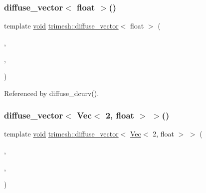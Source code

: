 \subsubsection{\texorpdfstring{diffuse\+\_\+vector$<$ float $>$()}{diffuse\_vector< float >()}}
{\footnotesize\ttfamily template \hyperlink{namespacetrimesh_a784ddfd979e1c579bda795a8edfc3f43}{void} \hyperlink{namespacetrimesh_a8fa6ac94a71d33cb6e11c29e76501519}{trimesh\+::diffuse\+\_\+vector}$<$ float $>$ (\begin{DoxyParamCaption}\item[{\hyperlink{classtrimesh_1_1TriMesh}{Tri\+Mesh} $\ast$}]{,  }\item[{vector$<$ float $>$ \&}]{,  }\item[{float}]{ }\end{DoxyParamCaption})}



Referenced by diffuse\+\_\+dcurv().

\mbox{\label{namespacetrimesh_a2dbe3f073888c87f6853c5c0ea262688}} 
\subsubsection{\texorpdfstring{diffuse\+\_\+vector$<$ Vec$<$ 2, float $>$ $>$()}{diffuse\_vector< Vec< 2, float > >()}}
{\footnotesize\ttfamily template \hyperlink{namespacetrimesh_a784ddfd979e1c579bda795a8edfc3f43}{void} \hyperlink{namespacetrimesh_a8fa6ac94a71d33cb6e11c29e76501519}{trimesh\+::diffuse\+\_\+vector}$<$ \hyperlink{classtrimesh_1_1Vec}{Vec}$<$ 2, float $>$ $>$ (\begin{DoxyParamCaption}\item[{\hyperlink{classtrimesh_1_1TriMesh}{Tri\+Mesh} $\ast$}]{,  }\item[{vector$<$ \hyperlink{classtrimesh_1_1Vec}{Vec}$<$ 2, float $>$ $>$ \&}]{,  }\item[{float}]{ }\end{DoxyParamCaption})}

\mbox{\label{namespacetrimesh_a1e29a6392a8305ee947e3fed7d6ab08c}} 
